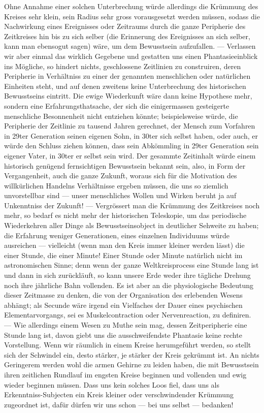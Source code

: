 Ohne Annahme einer solchen Unterbrechung würde allerdings die Krümmung des Kreises sehr klein, sein Radius sehr gross vorausgesetzt werden müssen, sodass die Nachwirkung eines Ereignisses oder Zeitraums durch die ganze Peripherie des Zeitkreises hin bis zu sich selber (die Erinnerung des Ereignisses an sich selber, kann man ebensogut sagen)  wäre, um dem Bewusstsein aufzufallen. — Verlassen wir aber einmal das wirklich Gegebene und gestatten uns einen Phantasieeinblick ins Mögliche, so hindert nichts, geschlossene Zeitlinien zu construiren, deren Peripherie in  Verhältniss zu einer der genannten menschlichen oder natürlichen Einheiten steht, und auf denen zweitens keine Unterbrechung des historischen Bewusstseins eintritt. Die ewige Wiederkunft wäre dann keine Hypothese mehr, sondern eine Erfahrungsthatsache, der sich die einigermassen gesteigerte menschliche Besonnenheit nicht entziehen könnte; beispielsweise würde, die Peripherie der Zeitlinie zu tausend Jahren gerechnet, der Mensch zum Vorfahren in 29ter Generation seinen eigenen Sohn, in 30ter sich selbst haben, oder auch, er würde den Schluss ziehen können, dass sein Abkömmling in 29ter Generation sein eigener Vater, in 30ter er selbst sein wird. Der gesammte Zeitinhalt würde einem historisch genügend fernsichtigen Bewusstsein bekannt sein, also, in Form der Vergangenheit, auch die ganze Zukunft, woraus sich für die Motivation des willkürlichen Handelns Verhältnisse ergeben müssen, die uns so ziemlich unvorstellbar sind — unser menschliches Wollen und Wirken beruht ja auf Unkenntniss der Zukunft! — Vergrössert man die Krümmung des Zeitkreises noch mehr, so bedarf es nicht mehr der historischen Teleskopie, um das periodische Wiederkehren aller Dinge als Bewusstseinsobject in deutlicher Sehweite zu haben; die Erfahrung weniger Generationen, eines einzelnen Individuums würde ausreichen — vielleicht (wenn man den Kreis immer kleiner werden lässt) die einer Stunde, die einer Minute! Einer Stunde oder Minute natürlich nicht im astronomischen Sinne; denn wenn der ganze Weltkreisprocess eine Stunde lang ist und dann in sich zurückläuft, so kann unsere Erde weder ihre tägliche Drehung noch ihre jährliche Bahn vollenden. Es ist aber an die physiologische Bedeutung dieser Zeitmasse zu denken, die von der Organisation des erlebenden Wesens abhängt; als Secunde wäre irgend ein Vielfaches der Dauer eines psychischen Elementarvorgangs, sei es Muskelcontraction oder Nervenreaction, zu definiren. — Wie allerdings einem Wesen zu Muthe sein mag, dessen Zeitperipherie eine Stunde lang ist, davon giebt uns die ausschweifendste Phantasie keine rechte Vorstellung. Wenn wir räumlich in einem Kreise herumgeführt werden, so stellt sich der Schwindel ein, desto stärker, je stärker der Kreis gekrümmt ist. An nichts Geringerem werden wohl die armen Gehirne zu leiden haben, die mit Bewusstsein ihren zeitlichen Rundlauf im engsten Kreise beginnen und vollenden und ewig wieder beginnen müssen. Dass uns kein solches Loos fiel, dass uns als Erkenntniss-Subjecten ein Kreis kleiner oder verschwindender Krümmung zugeordnet ist, dafür dürfen wir uns schon — bei uns selbst — bedanken!
\par

